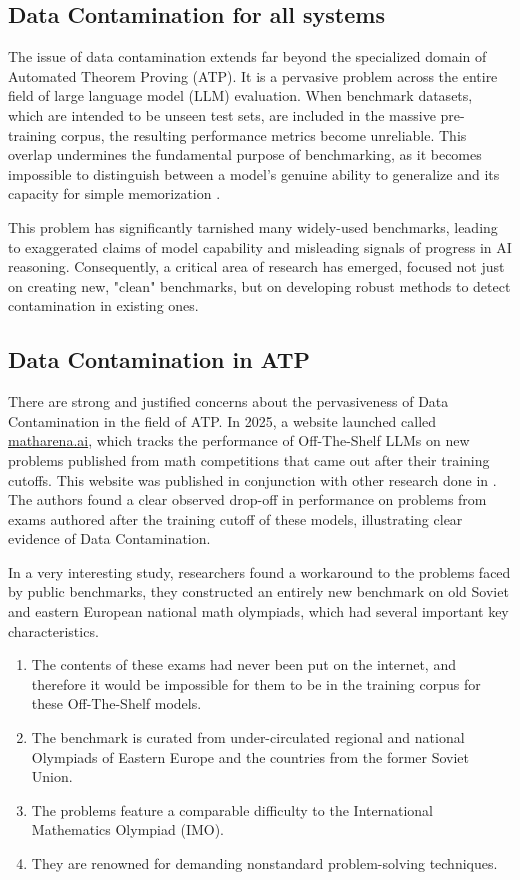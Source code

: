 \documentclass[12pt, letterpaper]{article}
\begin{document}
\subsection{Data Contamination for all systems} \label{sec:contamination_general}

The issue of data contamination extends far beyond the specialized domain of Automated Theorem Proving (ATP). It is a pervasive problem across the entire field of large language model (LLM) evaluation. When benchmark datasets, which are intended to be unseen test sets, are included in the massive pre-training corpus, the resulting performance metrics become unreliable. This overlap undermines the fundamental purpose of benchmarking, as it becomes impossible to distinguish between a model's genuine ability to generalize and its capacity for simple memorization \citep{choi2025how}.

This problem has significantly tarnished many widely-used benchmarks, leading to exaggerated claims of model capability and misleading signals of progress in AI reasoning. Consequently, a critical area of research has emerged, focused not just on creating new, "clean" benchmarks, but on developing robust methods to detect contamination in existing ones.

\subsection{Data Contamination in ATP}
There are strong and justified concerns about the pervasiveness of Data Contamination in the field of ATP. In 2025, a website launched called \href{https://matharena.ai}{matharena.ai}, which tracks the performance of Off-The-Shelf LLMs on new problems published from math competitions that came out after their training cutoffs. This website was published in conjunction with other research done in \citet{balunovic2025matharena}. The authors found a clear observed drop-off in performance on problems from exams authored after the training cutoff of these models, illustrating clear evidence of Data Contamination. 

In a very interesting study, researchers found a workaround to the problems faced by public benchmarks, they constructed an entirely new benchmark on old Soviet and eastern European national math olympiads, which had several important key characteristics. \citet{khatibi2025eefsuvanewmathematicalolympiad}
\begin{enumerate}
    \item The contents of these exams had never been put on the internet, and therefore it would be impossible for them to be in the training corpus for these Off-The-Shelf models.
    \item The benchmark is curated from under-circulated regional and national Olympiads of Eastern Europe and the countries from the former Soviet Union. 
    \item The problems feature a comparable difficulty to the International Mathematics Olympiad (IMO).
    \item They are renowned for demanding nonstandard problem-solving techniques.
\end{enumerate}
\end{document}
